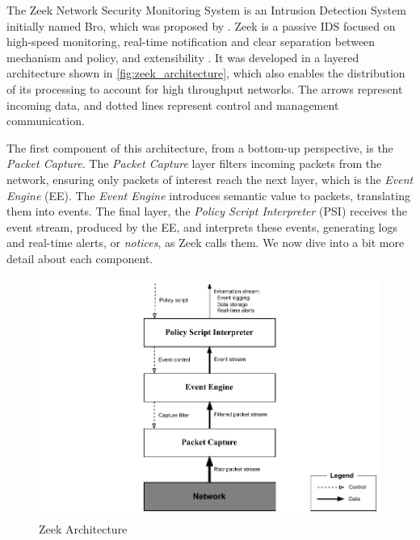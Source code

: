 The Zeek Network Security Monitoring System is an Intrusion Detection System initially named Bro, which was proposed by . Zeek is a passive IDS focused on high-speed monitoring, real-time notification and clear separation between mechanism and policy, and extensibility \cite{Paxson1999}. It was developed in a layered architecture shown in \autoref{fig:zeek_architecture}, which also enables the distribution of its processing to account for high throughput networks. The arrows represent incoming data, and dotted lines represent control and management communication.

The first component of this architecture, from a bottom-up perspective, is the \textit{Packet Capture}. The \textit{Packet Capture} layer filters incoming packets from the network, ensuring only packets of interest reach the next layer, which is the \textit{Event Engine} (EE). The \textit{Event Engine} introduces semantic value to packets, translating them into events. The final layer, the \textit{Policy Script Interpreter} (PSI) receives the event stream, produced by the EE, and interprets these events, generating logs and real-time alerts, or \textit{notices}, as Zeek calls them. We now dive into a bit more detail about each component.

\begin{figure}[htb]
    \caption{Zeek Architecture}
    \begin{center}
        \includegraphics[width=1.0\textwidth]{images/zeek-architecture.pdf}
    \end{center}
    \label{fig:zeek_architecture}
\end{figure}


